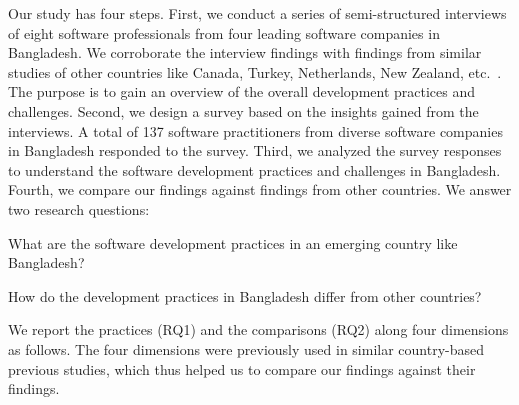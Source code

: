 Our study has four steps. First, we conduct a series of semi-structured interviews of eight software professionals from four 
leading software companies in Bangladesh. We corroborate the interview findings with findings from similar studies of 
other countries like 
Canada, Turkey, Netherlands, New Zealand, etc.~\cite{Garousi2013, Garousi2015, Vonken2012, Wang2018}. 
The purpose is to gain an overview of the overall development practices and challenges. 
Second, we design a survey based on the insights gained from the interviews. A total of 137 
software practitioners from diverse software companies in Bangladesh responded to the survey. Third, 
we analyzed the survey responses to understand the software development practices and challenges in Bangladesh. Fourth, 
we compare our findings against findings from other countries. We answer two research questions:
\begin{inparaenum}[(RQ1)]
  \item What are the software development practices in an emerging country like Bangladesh?
  \item How do the development practices in Bangladesh differ from other countries?
\end{inparaenum} We report the practices (RQ1) and the comparisons (RQ2) along four dimensions as follows. The four dimensions 
were previously used in similar country-based previous studies, which thus helped us to compare our findings against their findings.

